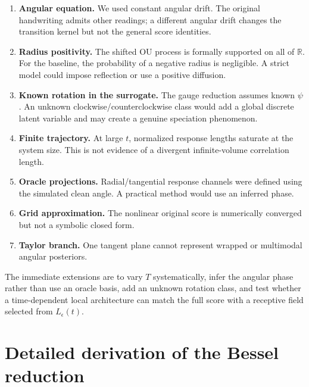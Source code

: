 \documentclass[11pt,a4paper]{article}
\newcommand{\R}{\mathbb{R}}
\begin{document}
\begin{enumerate}
\item \textbf{Angular equation.} We used constant angular drift. The original handwriting admits other readings; a different angular drift changes the transition kernel but not the general score identities.
\item \textbf{Radius positivity.} The shifted OU process is formally supported on all of $\R$. For the baseline, the probability of a negative radius is negligible. A strict model could impose reflection or use a positive diffusion.
\item \textbf{Known rotation in the surrogate.} The gauge reduction assumes known $\psi$. An unknown clockwise/counterclockwise class would add a global discrete latent variable and may create a genuine speciation phenomenon.
\item \textbf{Finite trajectory.} At large $t$, normalized response lengths saturate at the system size. This is not evidence of a divergent infinite-volume correlation length.
\item \textbf{Oracle projections.} Radial/tangential response channels were defined using the simulated clean angle. A practical method would use an inferred phase.
\item \textbf{Grid approximation.} The nonlinear original score is numerically converged but not a symbolic closed form.
\item \textbf{Taylor branch.} One tangent plane cannot represent wrapped or multimodal angular posteriors.
\end{enumerate}

The immediate extensions are to vary $T$ systematically, infer the angular phase rather than use an oracle basis, add an unknown rotation class, and test whether a time-dependent local architecture can match the full score with a receptive field selected from $L_\epsilon(t)$.

\appendix
\section{Detailed derivation of the Bessel reduction}
\end{document}
